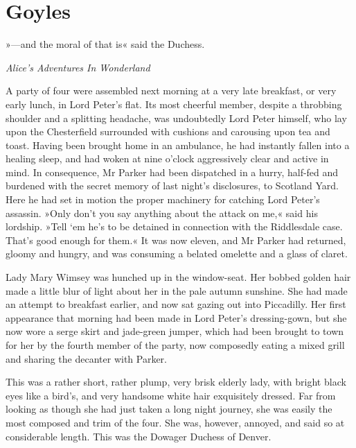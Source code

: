 

\chapter{Goyles}

\epigraph{»—and the moral of that is\longdash« said the Duchess.}{\textit{Alice's Adventures In Wonderland}}

\lettrine[lines=4]{A}{} party of four were assembled next morning at a very late breakfast, or very early lunch, in Lord Peter's flat. Its most cheerful member, despite a throbbing shoulder and a splitting headache, was undoubtedly Lord Peter himself, who lay upon the Chesterfield surrounded with cushions and carousing upon tea and toast. Having been brought home in an ambulance, he had instantly fallen into a healing sleep, and had woken at nine o'clock aggressively clear and active in mind. In consequence, Mr Parker had been dispatched in a hurry, half-fed and burdened with the secret memory of last night's disclosures, to Scotland Yard. Here he had set in motion the proper machinery for catching Lord Peter's assassin. »Only don't you say anything about the attack on me,« said his lordship. »Tell `em he's to be detained in connection with the Riddlesdale case. That's good enough for them.« It was now eleven, and Mr Parker had returned, gloomy and hungry, and was consuming a belated omelette and a glass of claret.

Lady Mary Wimsey was hunched up in the window-seat. Her bobbed golden hair made a little blur of light about her in the pale autumn sunshine.  She had made an attempt to breakfast earlier, and now sat gazing out into Piccadilly. Her first appearance that morning had been made in Lord Peter's dressing-gown, but she now wore a serge skirt and jade-green jumper, which had been brought to town for her by the fourth member of the party, now composedly eating a mixed grill and sharing the decanter with Parker.

This was a rather short, rather plump, very brisk elderly lady, with bright black eyes like a bird's, and very handsome white hair exquisitely dressed. Far from looking as though she had just taken a long night journey, she was easily the most composed and trim of the four. She was, however, annoyed, and said so at considerable length.  This was the Dowager Duchess of Denver.


